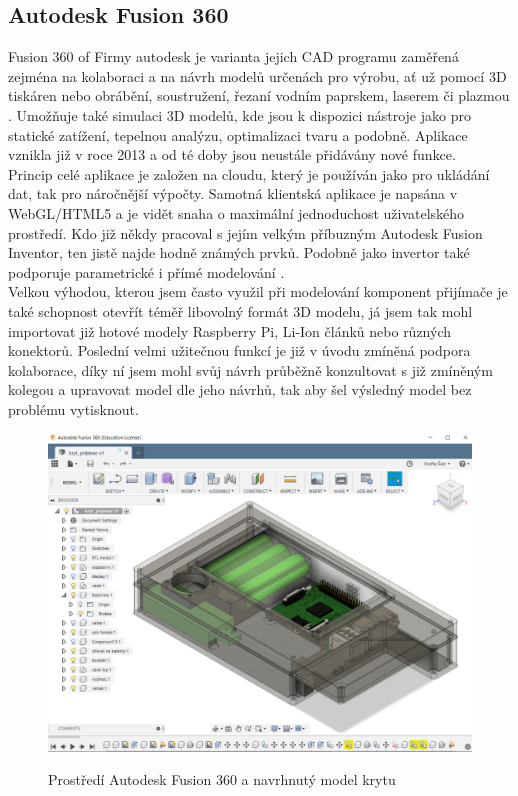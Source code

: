 \documentclass{ctuthesis}
\begin{document}
\subsection{Autodesk Fusion 360}
Fusion 360 of Firmy autodesk je varianta jejich CAD programu zaměřená zejména na kolaboraci a na návrh modelů určenách pro výrobu, ať už pomocí 3D tiskáren nebo obrábění, soustružení, řezaní vodním paprskem, laserem či plazmou \cite{autodesk2018}. Umožňuje také simulaci 3D modelů, kde jsou k dispozici nástroje jako pro statické zatížení, tepelnou analýzu, optimalizaci tvaru a podobně. Aplikace vznikla již v roce 2013 a od té doby jsou neustále přidávány nové funkce. \\
Princip celé aplikace je založen na cloudu, který je používán jako pro ukládání dat, tak pro náročnější výpočty. Samotná klientská aplikace je napsána v WebGL/HTML5 a je vidět snaha o maximální jednoduchost uživatelského prostředí. Kdo již někdy pracoval s jejím velkým příbuzným Autodesk Fusion Inventor, ten jistě najde hodně známých prvků. Podobně jako invertor také podporuje parametrické  i přímé modelování \cite{cadstudio}. \\
Velkou výhodou, kterou jsem často využil při modelování komponent přijímače je také schopnost otevřít téměř libovolný formát 3D modelu, já jsem tak mohl importovat již hotové modely Raspberry Pi, Li-Ion článků nebo různých konektorů. Poslední velmi užitečnou funkcí je již v úvodu zmíněná podpora kolaborace, díky ní jsem mohl svůj návrh průběžně konzultovat s již zmíněným kolegou a upravovat model dle jeho návrhů, tak aby šel výsledný model bez problému vytisknout.
\begin{figure}
\caption{Prostředí Autodesk Fusion 360 a navrhnutý model krytu}
\includegraphics[width=1\textwidth]{./images/3dmodel.png}
\label{3dmodel}
\end{figure}
\end{document}
